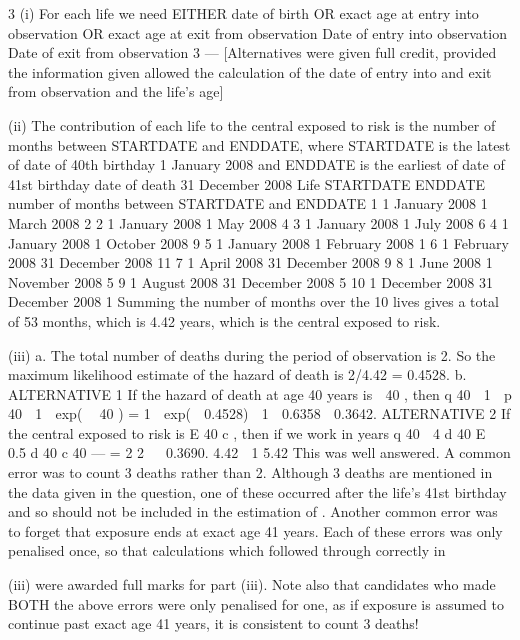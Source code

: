 \documentclass[a4paper,12pt]{article}
\begin{document}
3
(i) For each life we need
EITHER date of birth OR exact age at entry into observation OR exact age at
exit from observation
Date of entry into observation
Date of exit from observation
3  — %
[Alternatives were given full credit, provided the information given allowed the
calculation of the date of entry into and exit from observation and the life’s age]
\item (ii) The contribution of each life to the central exposed to risk is the number of
months between STARTDATE and ENDDATE, where STARTDATE is the
latest of date of 40th birthday 1 January 2008 and ENDDATE is the earliest of
date of 41st birthday date of death 31 December 2008
Life
STARTDATE
ENDDATE
number of months
between
STARTDATE
and ENDDATE
1 1 January 2008 1 March 2008 2
2 1 January 2008 1 May 2008 4
3 1 January 2008 1 July 2008 6
4 1 January 2008 1 October 2008 9
5 1 January 2008 1 February 2008 1
6 1 February 2008 31 December 2008 11
7 1 April 2008 31 December 2008 9
8 1 June 2008 1 November 2008 5
9 1 August 2008 31 December 2008 5
10 1 December 2008 31 December 2008 1
Summing the number of months over the 10 lives gives a total of 53 months,
which is 4.42 years, which is the central exposed to risk.
\item (iii)
a. The total number of deaths during the period of observation is 2. So the
maximum likelihood estimate of the hazard of death is 2/4.42 =
0.4528.
b. ALTERNATIVE 1
If the hazard of death at age 40 years is  40 , then
q 40  1  p 40  1  exp(  40 )
= 1  exp(  0.4528)  1  0.6358  0.3642.
ALTERNATIVE 2
If the central exposed to risk is E 40 c , then if we work in years
q 40 
4
d 40
E  0.5 d 40
c
40  — %
=
2
2

 0.3690.
4.42  1 5.42
This was well answered. A common error was to count 3 deaths rather than 2.
Although 3 deaths are mentioned in the data given in the question, one of these
occurred after the life’s 41st birthday and so should not be included in the estimation
of  . Another common error was to forget that exposure ends at exact age 41 years.
Each of these errors was only penalised once, so that calculations which followed
through correctly in \item (iii) were awarded full marks for part (iii). Note also that
candidates who made BOTH the above errors were only penalised for one, as if
exposure is assumed to continue past exact age 41 years, it is consistent to count 3
deaths!
\end{document}
